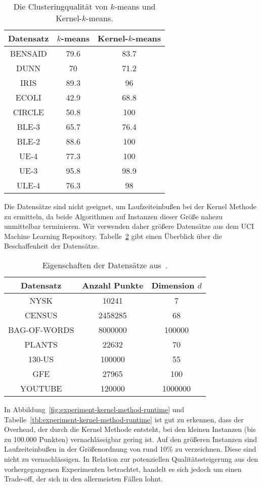\begin{table}[t]
\centering
\begin{tabular}{@{}ccc@{}} \toprule
	\textbf{Datensatz} & \textbf{$k$-means} & \textbf{Kernel-$k$-means} \\ \midrule
	BENSAID & 79.6 & 83.7 \\
	DUNN & 70 & 71.2 \\
	IRIS & 89.3 & 96 \\
	ECOLI & 42.9 & 68.8 \\
	CIRCLE & 50.8 & 100 \\
	BLE-3 & 65.7 & 76.4 \\
	BLE-2 & 88.6 & 100 \\
	UE-4 & 77.3 & 100 \\
	UE-3 & 95.8 & 98.9 \\
	ULE-4 & 76.3 & 98 \\ \bottomrule
\end{tabular}
\caption{Die Clusteringqualität von $k$-means und Kernel-$k$-means.}
\label{tbl:experiment-kernel-method-quality}
\end{table}
\absatz
Die Datensätze sind nicht geeignet, um Laufzeiteinbußen bei der Kernel Methode zu ermitteln, da beide Algorithmen auf Instanzen
dieser Größe nahezu unmittelbar terminieren. Wir verwenden daher größere Datensätze aus dem UCI Machine Learning Repository.
Tabelle~\ref{tbl:experiment-kernel-method-runtime-datasets} gibt einen Überblick über die Beschaffenheit der Datensätze.

\begin{table}[h]
\centering
\begin{tabular}{@{}ccc@{}} \toprule
	\textbf{Datensatz} & \textbf{Anzahl Punkte} & \textbf{Dimension} $d$ \\ \midrule
	NYSK & 10241 & 7 \\
	CENSUS & 2458285  & 68 \\
	BAG-OF-WORDS & 8000000 & 100000 \\
	PLANTS & 22632 & 70 \\
	130-US & 100000 & 55 \\
	GFE & 27965 & 100 \\
	YOUTUBE & 120000 & 1000000 \\ \bottomrule
\end{tabular}
\caption{Eigenschaften der Datensätze aus~\cite{Lichman13}.}
\label{tbl:experiment-kernel-method-runtime-datasets}
\end{table}
In Abbildung~\ref{fig:experiment-kernel-method-runtime} und Tabelle~\ref{tbl:experiment-kernel-method-runtime} ist gut zu
erkennen, dass der Overhead, der durch die Kernel Methode entsteht, bei den kleinen Instanzen (bis zu 100.000 Punkten)
vernachlässigbar gering ist. Auf den größeren Instanzen sind Laufzeiteinbußen in der Größenordnung von rund 10\% zu verzeichnen.
Diese sind nicht zu vernachlässigen. In Relation zur potenziellen Qualitätssteigerung aus den vorhergegangenen Experimenten
betrachtet, handelt es sich jedoch um einen Trade-off, der sich in den allermeisten Fällen lohnt.

